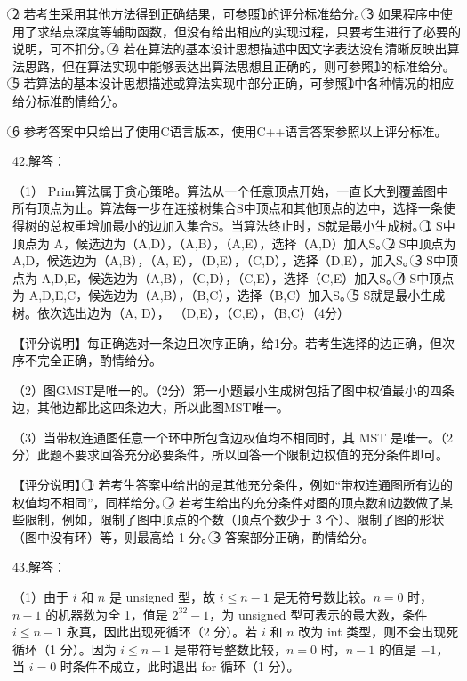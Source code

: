 \documentclass[UTF8,11pt]{ctexart}
\begin{document}
\textcircled{2} 若考生采用其他方法得到正确结果，可参照\textcircled{1}的评分标准给分。\textcircled{3} 如果程序中使用了求结点深度等辅助函数，但没有给出相应的实现过程，只要考生进行了必要的说明，可不扣分。\textcircled{4} 若在算法的基本设计思想描述中因文字表达没有清晰反映出算法思路，但在算法实现中能够表达出算法思想且正确的，则可参照\textcircled{1}的标准给分。\textcircled{5} 若算法的基本设计思想描述或算法实现中部分正确，可参照\textcircled{1}中各种情况的相应给分标准酌情给分。


\textcircled{6} 参考答案中只给出了使用C语言版本，使用C++语言答案参照以上评分标准。


42.解答：


（1） Prim算法属于贪心策略。算法从一个任意顶点开始，一直长大到覆盖图中所有顶点为止。算法每一步在连接树集合S中顶点和其他顶点的边中，选择一条使得树的总权重增加最小的边加入集合S。当算法终止时，S就是最小生成树。\textcircled{1} S中顶点为 A，候选边为（A,D），（A,B），（A,E），选择（A,D）加入S。\textcircled{2} S中顶点为 A,D，候选边为（A,B），（A, E），（D,E），（C,D），选择（D,E），加入S。\textcircled{3} S中顶点为 A,D,E，候选边为（A,B），（C,D），（C,E），选择（C,E）加入S。\textcircled{4} S中顶点为 A,D,E,C，候选边为（A,B），（B,C），选择（B,C）加入S。\textcircled{5} S就是最小生成树。依次选出边为（A, D）， （D,E），（C,E），（B,C）（4分）


【评分说明】每正确选对一条边且次序正确，给1分。若考生选择的边正确，但次序不完全正确，酌情给分。


（2）图GMST是唯一的。（2分）第一小题最小生成树包括了图中权值最小的四条边，其他边都比这四条边大，所以此图MST唯一。


（3）当带权连通图任意一个环中所包含边权值均不相同时，其 MST 是唯一。（2 分）此题不要求回答充分必要条件，所以回答一个限制边权值的充分条件即可。


【评分说明】\textcircled{1} 若考生答案中给出的是其他充分条件，例如“带权连通图所有边的权值均不相同”，同样给分。\textcircled{2} 若考生给出的充分条件对图的顶点数和边数做了某些限制，例如，限制了图中顶点的个数（顶点个数少于 3 个）、限制了图的形状（图中没有环）等，则最高给 1 分。\textcircled{3} 答案部分正确，酌情给分。


43.解答：


（1）由于 \(\displaystyle i\) 和 \(\displaystyle n\) 是 unsigned 型，故 \(\displaystyle i\leq n-1\) 是无符号数比较。\(\displaystyle n=0\) 时，\(\displaystyle n-1\) 的机器数为全 1，值是 \(\displaystyle 2^{32}-1\)，为 unsigned 型可表示的最大数，条件 \(\displaystyle i\leq n-1\) 永真，因此出现死循环（2 分）。若 \(\displaystyle i\) 和 \(\displaystyle n\) 改为 int 类型，则不会出现死循环（1 分）。因为 \(\displaystyle i\leq n-1\) 是带符号整数比较，\(\displaystyle n=0\) 时，\(\displaystyle n-1\) 的值是 \(\displaystyle -1\)，当 \(\displaystyle i=0\) 时条件不成立，此时退出 for 循环（1 分）。
\end{document}
